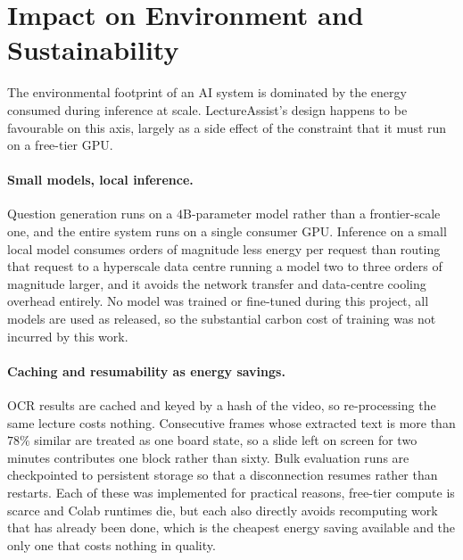 \section{Impact on Environment and Sustainability}
\label{sec:impacts-env}

The environmental footprint of an AI system is dominated by the energy consumed
during inference at scale. LectureAssist's design happens to be favourable on this
axis, largely as a side effect of the constraint that it must run on a free-tier GPU.

\paragraph{Small models, local inference.} Question generation runs on a
$4$B-parameter model rather than a frontier-scale one, and the entire system runs on
a single consumer GPU. Inference on a small local model consumes orders of magnitude
less energy per request than routing that request to a hyperscale data centre running
a model two to three orders of magnitude larger, and it avoids the network transfer
and data-centre cooling overhead entirely. No model was trained or fine-tuned during
this project, all models are used as released, so the substantial carbon cost
of training was not incurred by this work.

\paragraph{Caching and resumability as energy savings.} OCR results are cached and
keyed by a hash of the video, so re-processing the same lecture costs nothing.
Consecutive frames whose extracted text is more than $78\%$ similar are treated as
one board state, so a slide left on screen for two minutes contributes one block
rather than sixty. Bulk evaluation runs are checkpointed to persistent storage so
that a disconnection resumes rather than restarts. Each of these was implemented for
practical reasons, free-tier compute is scarce and Colab runtimes die, but each
also directly avoids recomputing work that has already been done, which is the
cheapest energy saving available and the only one that costs nothing in quality.

